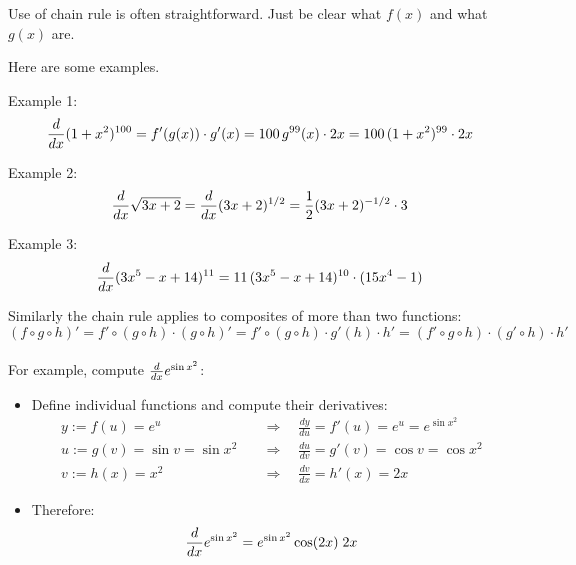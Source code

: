 \begin{frame}
    Use of chain rule is often straightforward. Just be clear what $f(x)$ and what $g(x)$ are.

    Here are some examples.

    Example 1:
    $${d\over dx}(1+x^2)^{100}=f'(g(x))\cdot g'(x)=100\,g^{99}(x)\cdot 2x=
        100\,(1+x^2)^{99}\cdot 2x$$

    Example 2:
    $${d\over dx}\sqrt{3x+2}={d\over dx}(3x+2)^{1/2}=
            {1\over 2}(3x+2)^{-1/2}\cdot 3$$

    Example 3:
    $${d\over dx}(3x^5-x+14)^{11}=11\,(3x^5-x+14)^{10}\cdot(15x^4-1)$$

\end{frame}


\begin{frame}
    Similarly the chain rule applies to composites of more than two functions:
    $$
        (f \circ g \circ h)'
        = f' \circ (g \circ h)\cdot (g \circ h)'
        = f' \circ (g \circ h) \cdot g'(h) \cdot h'
        = (f' \circ g \circ h) \cdot (g' \circ h) \cdot h'
    $$
    \\[5mm]
    For example, compute ${d \over dx} e^{\sin x^2}$:
    \begin{itemize}
        \item Define individual functions and compute their derivatives:
              \begin{align*}
                  y := f(u) = e^u \quad               & \Longrightarrow \quad \frac{dy}{du} = f'(u) = e^u = e^{\sin x^2} \\
                  u := g(v) = \sin v = \sin x^2 \quad & \Longrightarrow \quad \frac{du}{dv} = g'(v) = \cos v = \cos x^2  \\
                  v := h(x) = x^2 \quad               & \Longrightarrow \quad \frac{dv}{dx} = h'(x) = 2x
              \end{align*}
        \item Therefore:
              $${d \over dx} e^{\sin x^2} = e^{\sin x^2} \cos(2x)\;2x$$
    \end{itemize}
\end{frame}

